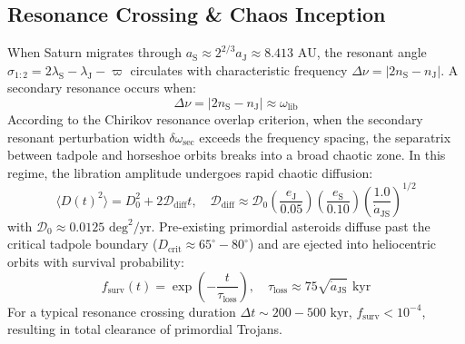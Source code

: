 \documentclass[11pt,a4paper]{article}
\begin{document}
\subsection{Resonance Crossing \& Chaos Inception}
When Saturn migrates through $a_{\text{S}} \approx 2^{2/3} a_{\text{J}} \approx 8.413\text{ AU}$, the resonant angle $\sigma_{1:2} = 2\lambda_{\text{S}} - \lambda_{\text{J}} - \varpi$ circulates with characteristic frequency $\Delta \nu = |2n_{\text{S}} - n_{\text{J}}|$. A secondary resonance occurs when:
\begin{equation}
\Delta \nu = |2n_{\text{S}} - n_{\text{J}}| \approx \omega_{\text{lib}}
\end{equation}
According to the Chirikov resonance overlap criterion, when the secondary resonant perturbation width $\delta \omega_{\text{sec}}$ exceeds the frequency spacing, the separatrix between tadpole and horseshoe orbits breaks into a broad chaotic zone. In this regime, the libration amplitude undergoes rapid chaotic diffusion:
\begin{equation}
\langle D(t)^2 \rangle = D_0^2 + 2 \mathcal{D}_{\text{diff}} t, \quad \mathcal{D}_{\text{diff}} \approx \mathcal{D}_0 \left(\frac{e_{\text{J}}}{0.05}\right) \left(\frac{e_{\text{S}}}{0.10}\right) \left(\frac{1.0}{\dot{a}_{\text{JS}}}\right)^{1/2}
\end{equation}
with $\mathcal{D}_0 \approx 0.0125\text{ deg}^2/\text{yr}$. Pre-existing primordial asteroids diffuse past the critical tadpole boundary ($D_{\text{crit}} \approx 65^\circ-80^\circ$) and are ejected into heliocentric orbits with survival probability:
\begin{equation}
f_{\text{surv}}(t) = \exp\left(-\frac{t}{\tau_{\text{loss}}}\right), \quad \tau_{\text{loss}} \approx 75 \sqrt{\dot{a}_{\text{JS}}}\text{ kyr}
\end{equation}
For a typical resonance crossing duration $\Delta t \sim 200-500\text{ kyr}$, $f_{\text{surv}} < 10^{-4}$, resulting in total clearance of primordial Trojans.
\end{document}
